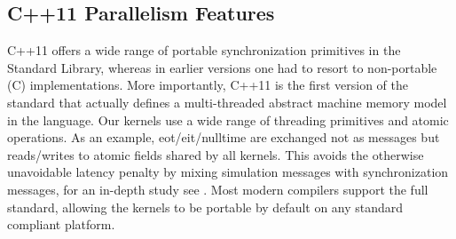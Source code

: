 \subsection{C++11 Parallelism Features}
C++11 offers a wide range of portable synchronization primitives in the Standard Library, whereas in earlier versions one had to resort to non-portable (C) implementations. More importantly, C++11 is the first version of the standard that actually defines a multi-threaded abstract machine memory model in the language.
Our kernels use a wide range of threading primitives and atomic operations. As an example, eot/eit/nulltime are exchanged not as messages but reads/writes to atomic fields shared by all kernels. This avoids the otherwise unavoidable latency penalty by mixing simulation messages with synchronization messages, for an in-depth study see \cite{CPE:CPE3007}.
Most modern compilers support the full standard, allowing the kernels to be portable by default on any standard compliant platform. 
